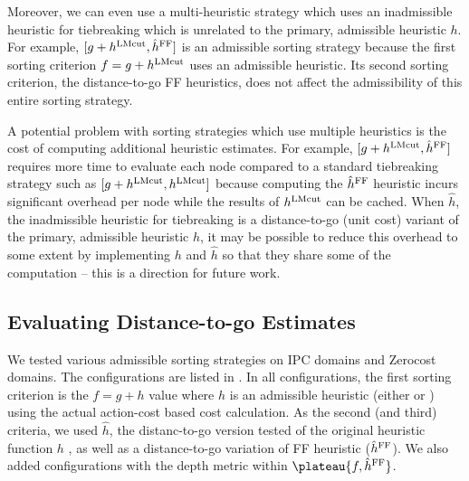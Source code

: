 Moreover, we can even use a multi-heuristic strategy which uses an inadmissible heuristic for tiebreaking which is unrelated to the primary, admissible heuristic $h$.
 For example, $[g+h^{\text{LMcut}},\hat{h}^{\text{FF}}]$ is an admissible sorting strategy
because the first sorting criterion $f=g+h^{\text{LMcut}}$ uses an admissible
\lmcut heuristic. Its second sorting criterion, the distance-to-go FF
heuristics, does not affect the admissibility of this entire sorting strategy.

A potential problem with sorting strategies which use multiple heuristics is the cost of computing additional
heuristic estimates. For example, $[g+h^{\text{LMcut}},\hat{h}^{\text{FF}}]$ requires more time to evaluate each node compared to a standard tiebreaking strategy such as $[g+h^{\text{LMcut}},h^{\text{LMcut}}]$ because computing the $\hat{h}^{\text{FF}}$ heuristic incurs significant overhead per node while the results of $h^{\text{LMcut}}$ can be cached.
When $\hat{h}$, the inadmissible heuristic for tiebreaking is a distance-to-go (unit cost) variant of the primary, admissible heuristic $h$, it may be possible to reduce this overhead to some extent by implementing $h$ and $\hat{h}$ so that they share some of the computation  -- this is a direction for future work.

\subsection{Evaluating Distance-to-go Estimates}

We tested various admissible sorting strategies on IPC domains and Zerocost domains.
The configurations are listed in . 
In all configurations, the first sorting criterion is the $f=g+h$ value
where $h$ is an admissible heuristic (either \lmcut or \mands) using the actual action-cost based  cost calculation.
As the second (and third) criteria,
we used $\hat{h}$, the distanc-to-go version tested  of the original heuristic function $h$ , as well as a distance-to-go variation of FF
heuristic ($\hat{h}^{\text{FF}}$).
We also added configurations with the depth metric within
$\plateau{f,\hat{h}^{\text{\ff}}}$.

